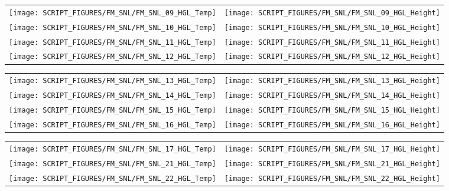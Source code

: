 \begin{figure}[p]
\begin{tabular*}{\textwidth}{l@{\extracolsep{\fill}}r}
\texttt{[image: SCRIPT\_FIGURES/FM\_SNL/FM\_SNL\_09\_HGL\_Temp]} &
\texttt{[image: SCRIPT\_FIGURES/FM\_SNL/FM\_SNL\_09\_HGL\_Height]} \\\texttt{[image: SCRIPT\_FIGURES/FM\_SNL/FM\_SNL\_10\_HGL\_Temp]} &
\texttt{[image: SCRIPT\_FIGURES/FM\_SNL/FM\_SNL\_10\_HGL\_Height]} \\
\texttt{[image: SCRIPT\_FIGURES/FM\_SNL/FM\_SNL\_11\_HGL\_Temp]} &
\texttt{[image: SCRIPT\_FIGURES/FM\_SNL/FM\_SNL\_11\_HGL\_Height]} \\
\texttt{[image: SCRIPT\_FIGURES/FM\_SNL/FM\_SNL\_12\_HGL\_Temp]} &
\texttt{[image: SCRIPT\_FIGURES/FM\_SNL/FM\_SNL\_12\_HGL\_Height]}
\end{tabular*}
\end{figure}

\begin{figure}[p]
\begin{tabular*}{\textwidth}{l@{\extracolsep{\fill}}r}
\texttt{[image: SCRIPT\_FIGURES/FM\_SNL/FM\_SNL\_13\_HGL\_Temp]} &
\texttt{[image: SCRIPT\_FIGURES/FM\_SNL/FM\_SNL\_13\_HGL\_Height]} \\
\texttt{[image: SCRIPT\_FIGURES/FM\_SNL/FM\_SNL\_14\_HGL\_Temp]} &
\texttt{[image: SCRIPT\_FIGURES/FM\_SNL/FM\_SNL\_14\_HGL\_Height]} \\
\texttt{[image: SCRIPT\_FIGURES/FM\_SNL/FM\_SNL\_15\_HGL\_Temp]} &
\texttt{[image: SCRIPT\_FIGURES/FM\_SNL/FM\_SNL\_15\_HGL\_Height]} \\
\texttt{[image: SCRIPT\_FIGURES/FM\_SNL/FM\_SNL\_16\_HGL\_Temp]} &
\texttt{[image: SCRIPT\_FIGURES/FM\_SNL/FM\_SNL\_16\_HGL\_Height]}
\end{tabular*}\end{figure}

\begin{figure}[p]
\begin{tabular*}{\textwidth}{l@{\extracolsep{\fill}}r}
\texttt{[image: SCRIPT\_FIGURES/FM\_SNL/FM\_SNL\_17\_HGL\_Temp]} &
\texttt{[image: SCRIPT\_FIGURES/FM\_SNL/FM\_SNL\_17\_HGL\_Height]} \\
\texttt{[image: SCRIPT\_FIGURES/FM\_SNL/FM\_SNL\_21\_HGL\_Temp]} &
\texttt{[image: SCRIPT\_FIGURES/FM\_SNL/FM\_SNL\_21\_HGL\_Height]} \\
\texttt{[image: SCRIPT\_FIGURES/FM\_SNL/FM\_SNL\_22\_HGL\_Temp]} &
\texttt{[image: SCRIPT\_FIGURES/FM\_SNL/FM\_SNL\_22\_HGL\_Height]}
\end{tabular*}
\end{figure}

